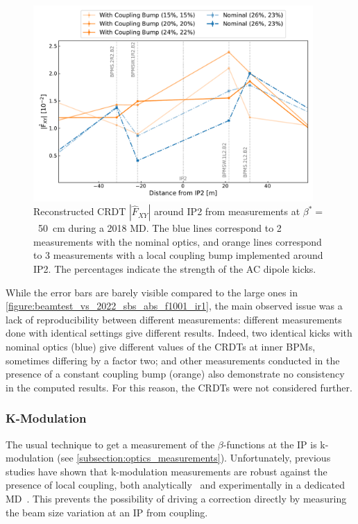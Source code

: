 \begin{figure}[!htb]
    \centering
    \includegraphics*[width=0.95\textwidth]{Figures/IR_Coupling_Correction/crdt_fxy_nominal_vs_colin_md_2018.pdf}
    \caption{Reconstructed CRDT \(|\hat{F}_{XY}|\) around IP\num{2} from measurements at \(\beta^{\ast} =\)~\qty{50}{\centi\meter} during a \num{2018} MD. The \textcolor{mplblue}{blue} lines correspond to \num{2} measurements with the nominal optics, and \textcolor{mplorange}{orange} lines correspond to \num{3} measurements with a local coupling bump implemented around IP\num{2}. The percentages indicate the strength of the AC dipole kicks.}
    \label{figure:crdt_fxy_nominal_vs_colin_md_2018}
\end{figure}

While the error bars are barely visible compared to the large ones in \cref{figure:beamtest_vs_2022_sbs_abs_f1001_ir1}, the main observed issue was a lack of reproducibility between different measurements: different measurements done with identical settings give different results.
Indeed, two identical kicks with nominal optics (\textcolor{mplblue}{blue}) give different values of the CRDTs at inner BPMs, sometimes differing by a factor two; and other measurements conducted in the presence of a constant coupling bump (\textcolor{mplorange}{orange}) also demonstrate no consistency in the computed results.
For this reason, the CRDTs were not considered further.

\subsubsection*{K-Modulation}

The usual technique to get a measurement of the \(\beta\)-functions at the IP is k-modulation (see \cref{subsection:optics_measurements}).
Unfortunately, previous studies have shown that k-modulation measurements are robust against the presence of local coupling, both analytically~\cite{PRAB:Hofer:Coupling_Local_Observables, PRAB:Carlier:KModulation_HiLumi} and experimentally in a dedicated \gls{MD}~\cite{CERN:Persson:Local_Coupling_IP}.
This prevents the possibility of driving a correction directly by measuring the beam size variation at an IP from coupling. 

